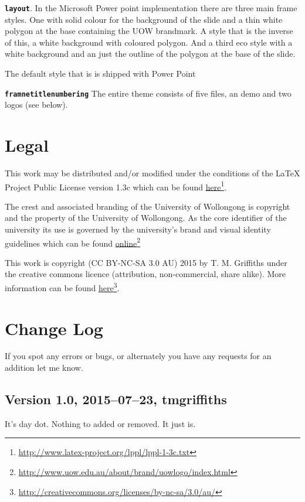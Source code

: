 \documentclass[a4paper,oneside,12pt]{article}
\newcommand{\key}[1]{\texttt{\color{UOWorange}#1}}
\begin{document}
\textbf{\key{layout}}.\marginnote{\key{key}} In the Microsoft Power point implementation there are three main frame styles. One with solid colour for the background of the slide and a thin white polygon at the base containing the UOW brandmark. A style that is the inverse of this, a white background with coloured polygon. And a third eco style with a white background and an just the outline of the polygon at the base of the slide.

The default style that is is shipped with Power Point

\textbf{\key{framnetitlenumbering}}\marginnote{\key{key}} The entire theme consists of five files, an demo and two logos (see below).

\section{Legal}
This work may be distributed and/or modified under the conditions of the LaTeX Project Public License version 1.3c which can be found \href{http://www.latex-project.org/lppl/lppl-1-3c.txt}{here}\footnote{\url{http://www.latex-project.org/lppl/lppl-1-3c.txt}}.

The crest and associated branding of the University of Wollongong is copyright and the property of the University of Wollongong. As the core identifier of the university its use is governed by the university's brand and visual identity guidelines which can be found \href{http://www.uow.edu.au/about/brand/uowlogo/index.html}{online}\footnote{\url{http://www.uow.edu.au/about/brand/uowlogo/index.html}}

This work is copyright (CC BY-NC-SA 3.0 AU) 2015 by T. M. Griffiths under the creative commons licence (attribution, non-commercial, share alike). More information can be found \href{http://creativecommons.org/licenses/by-nc-sa/3.0/au/}{here}\footnote{\url{http://creativecommons.org/licenses/by-nc-sa/3.0/au/}}.

\section{Change Log}
If you spot any errors or bugs, or alternately you have any requests for an addition let me know.
\subsection*{Version 1.0, 2015–07–23, tmgriffiths}
It's day dot. Nothing to added or removed. It just is.
\end{document}
